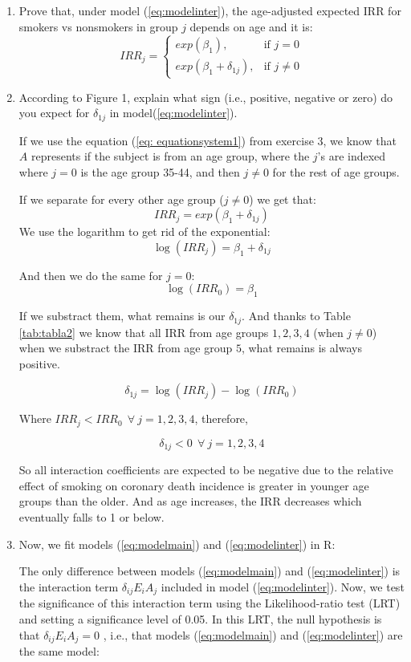 \documentclass[10pt,a4paper,twoside]{article}\usepackage[]{graphicx}\usepackage[]{xcolor}
\begin{document}
\begin{enumerate}
\item Prove that, under model (\ref{eq:modelinter}), the age-adjusted expected IRR for smokers vs nonsmokers in group $j$ depends on age and it is:
\begin{equation}
\label{eq: equationsystem1}
IRR_{j} =
\begin{cases}
exp\left(\beta_{1}\right), & \text{if $j = 0$} \\
exp\left(\beta_{1} + \delta_{1j}\right), & \text{if $j \neq 0$}
\end{cases}
\end{equation}


\item  According to Figure 1, explain what sign (i.e., positive, negative or zero) do you expect for $\delta_{1j}$ in model(\ref{eq:modelinter}).

If we use the equation (\ref{eq: equationsystem1}) from exercise 3, we know that $A$ represents if the subject is from an age group, where the $j$'s are indexed where $j = 0$ is the age group 35-44, and then $j \neq 0$ for the rest of age groups. 

If we separate for every other age group ($j \neq 0$) we get that: 
\[
IRR_{j} = exp(\beta_1 + \delta_{1j})
\]
We use the logarithm to get rid of the exponential:
\[
\log(IRR_{j}) = \beta_1 + \delta_{1j}
\]

And then we do the same for $j = 0$:
\[
\log(IRR_{0}) = \beta_1
\]

If we substract them, what remains is our $\delta_{1j}$. And thanks to Table \ref{tab:tabla2} we know that all IRR from age groups $1, 2, 3, 4$ (when $j \neq 0$) when we substract the IRR from age group $5$, what remains is always positive.

\[
\delta_{1j}=\log(IRR_j)-\log(IRR_0)
\]

Where $IRR_{j} < IRR_{0} \ \ \forall \ j = 1, 2, 3, 4$, therefore,

\[
\delta_{1j} < 0 \ \ \forall \ j= 1, 2, 3, 4
\]

So all interaction coefficients are expected to be negative due to the relative effect of smoking on coronary death incidence is greater in younger age groups than the older. And as age increases, the IRR decreases which eventually falls to 1 or below.

\item Now, we fit models (\ref{eq:modelmain}) and (\ref{eq:modelinter}) in R:

The only difference between models (\ref{eq:modelmain}) and (\ref{eq:modelinter}) is the interaction term $\delta_{ij}E_{i}A_{j}$
included in model (\ref{eq:modelinter}). Now, we test the significance of this interaction term using
the Likelihood-ratio test (LRT) and setting a significance level of 0.05. In this LRT,
the null hypothesis is that $\delta_{ij}E_{i}A_{j} = 0$ , i.e., that models (\ref{eq:modelmain}) and (\ref{eq:modelinter}) are the same model:


\end{enumerate}
\end{document}
